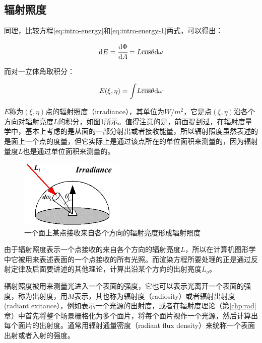 \subsection{辐射照度}\label{sec:irradiance}
同理，比较方程\ref{eq:intro-energy}和\ref{eq:intro-energy-1}两式，可以得出：

\begin{equation}
	{\rm d}E= \cfrac{{\rm d}\Phi}{{\rm d}A}=L\overline{\cos}\theta {\rm d}\omega
\end{equation}

\noindent 而对一立体角取积分：

\begin{equation}
	E(\xi,\eta)={\rm \int} L\overline{\cos}\theta {\rm d}\omega
\end{equation}

\noindent $E$称为$(\xi,\eta)$点的辐射照度（irradiance），其单位为$W/m^2$，它是点$(\xi,\eta)$沿各个方向对辐射亮度$L$的积分，如图\ref{f:intro-irradiance}所示。值得注意的是，前面提到过，在辐射度量学中，基本上考虑的是从面的一部分射出或者接收能量，所以辐射照度虽然表述的是面上一个点的度量，但它实际上是通过该点所在的单位面积来测量的，因为辐射量度$L$也是通过单位面积来测量的。

\begin{figure}
\sidecaption
	\includegraphics[width=0.45\textwidth]{figures/intro/irradiance}
	\caption{一个面上某点接收来自各个方向的辐射亮度形成辐射照度}
	\label{f:intro-irradiance}
\end{figure}

由于辐射照度表示一个点接收的来自各个方向的辐射亮度$L$，所以在计算机图形学中它被用来表述表面的一个点接收的所有光照。而渲染方程所要处理的正是通过反射定律及后面要讲述的其他理论，计算出沿某个方向的出射亮度$L_o$。

辐射照度被用来测量光进入一个表面的强度，它也可以表示光离开一个表面的强度，称为出射度，用$M$表示，其也称为辐射度（radiosity）或者辐射出射度(radiant exitance），例如表示一个光源的出射度，或者在辐射度理论（第\ref{chp:rad}章）中首先将整个场景栅格化为多个面片，将每个面片视作一个光源，然后计算出每个面片的出射度。通常用辐射通量密度（radiant flux density）来统称一个表面出射或者入射的强度。

